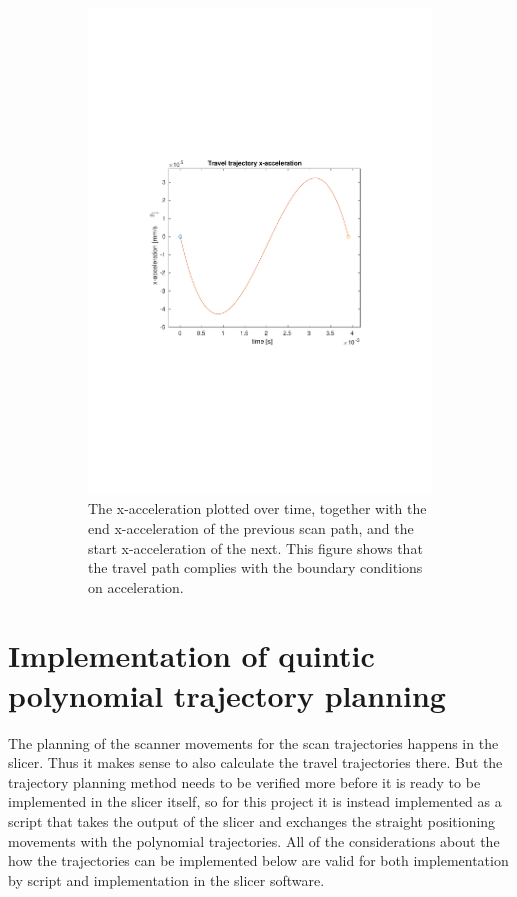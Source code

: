 \begin{figure}
\begin{subfigure}{0.72\textwidth}
        \includegraphics[clip, trim=3.5cm 9cm 4cm 9cm, width=\textwidth]{Pictures/5-traj-acc.pdf}
        \caption{The x-acceleration plotted over time, together with the end x-acceleration of the previous scan path, and the start x-acceleration of the next. This figure shows that the travel path complies with the boundary conditions on acceleration.}
        \label{fig:5-traj-acc}
    \end{subfigure}
    \caption{}
    \label{fig:5-traj-vel-acc}
\end{figure}

\section{Implementation of quintic polynomial trajectory planning}

The planning of the scanner movements for the scan trajectories happens in the slicer. Thus it makes sense to also calculate the travel trajectories there. But the trajectory planning method needs to be verified more before it is ready to be implemented in the slicer itself, so for this project it is instead implemented as a script that takes the output of the slicer and exchanges the straight positioning movements with the polynomial trajectories. All of the considerations about the how the trajectories can be implemented below are valid for both implementation by script and implementation in the slicer software.

